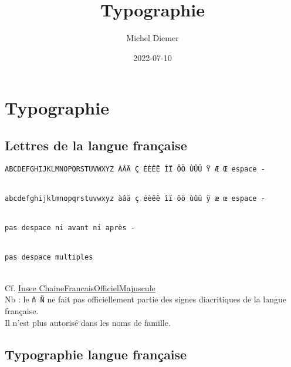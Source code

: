\documentclass[
  a4paper,
]{book}
\title{Typographie}
\author{Michel Diemer}
\date{2022-07-10}
\begin{document}
\frontmatter
\maketitle

{
\setcounter{tocdepth}{3}
\tableofcontents
}
\mainmatter
\hypertarget{typographie}{%
\section{Typographie}\label{typographie}}

\hypertarget{lettres-de-la-langue-franuxe7aise}{%
\subsection{Lettres de la langue française}\label{lettres-de-la-langue-franuxe7aise}}

\texttt{ABCDEFGHIJKLMNOPQRSTUVWXYZ\ ÀÂÄ\ Ç\ ÉÈÊË\ ÎÏ\ ÔÖ\ ÙÛÜ\ Ÿ\ Æ\ Œ\ espace\ -\ \textquotesingle{}}\strut \\
\texttt{abcdefghijklmnopqrstuvwxyz\ àâä\ ç\ éèêë\ îï\ ôö\ ùûü\ ÿ\ æ\ œ\ espace\ -\ \textquotesingle{}}\strut \\
\texttt{pas\ d\textquotesingle{}espace\ ni\ avant\ ni\ après\ -}\strut \\
\texttt{pas\ d\textquotesingle{}espace\ multiples}\strut \\
Cf. \href{https://xml.insee.fr/schema/commun.html\#ChaineFrancaisOfficielMajuscule_stype}{Insee ChaineFrancaisOfficielMajuscule}\\
Nb : le \texttt{ñ\ Ñ} ne fait pas officiellement partie des signes diacritiques de la langue française.\\
Il n'est plus autorisé dans les noms de famille.

\hypertarget{typographie-langue-franuxe7aise}{%
\subsection{Typographie langue française}\label{typographie-langue-franuxe7aise}}
\end{document}
